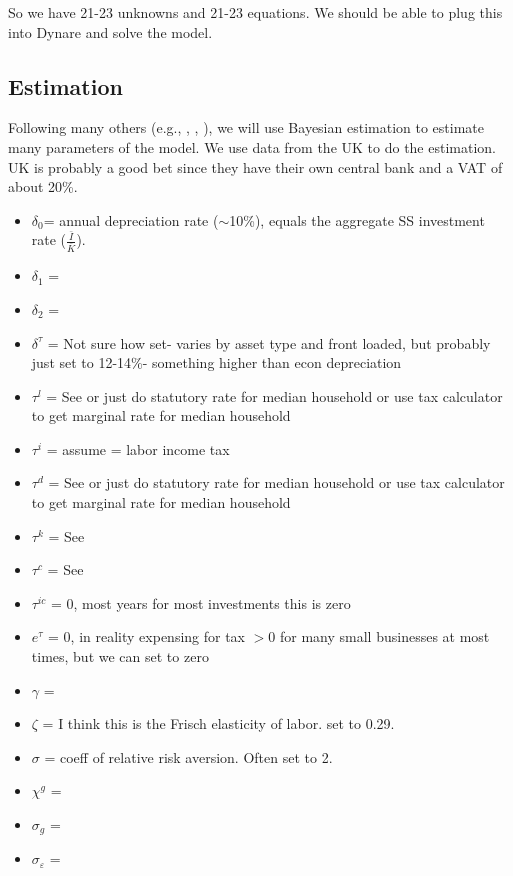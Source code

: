 \documentclass[article,11pt,letterpaper,fleqn]{article}
\theoremstyle{definition}
\numberwithin{equation}{section}
\newcommand{\cn}{\citeasnoun} %
\newcommand\ve{\varepsilon}
\begin{document}
So we have 21-23 unknowns and 21-23 equations.  We should be able to plug this into Dynare and solve the model.


\subsection{Estimation}

Following many others (e.g., \cn{TY2010}, \cn{Zubairy2010}, \cn{SW2003}), we will use Bayesian estimation to estimate many parameters of the model.  We use data from the UK to do the estimation.  UK is probably a good bet since they have their own central bank and a VAT of about 20\%.

\begin{itemize}
\item $\delta_{0}$= annual depreciation rate ($\sim$10\%), equals the aggregate SS investment rate ($\frac{\bar{I}}{\bar{K}}$).
\item $\delta_{1}$ = 
\item $\delta_{2}$ = 
\item $\delta^{\tau}$ = Not sure how set- varies by asset type and front loaded, but probably just set to 12-14\%- something higher than econ depreciation
\item $\tau^{l}$ = See \cn{Jones2002} or just do statutory rate for median household or use tax calculator to get marginal rate for median household
\item $\tau^{i}$ = assume = labor income tax
\item $\tau^{d}$ = See \cn{Jones2002} or just do statutory rate for median household or use tax calculator to get marginal rate for median household
\item $\tau^{k}$ = See \cn{Jones2002} 
\item $\tau^{c}$ = See \cn{Jones2002} 
\item $\tau^{ic}$ = 0, most years for most investments this is zero 
\item $e^{\tau}$ = 0, in reality expensing for tax $> 0$ for many small businesses at most times, but we can set to zero   
\item $\gamma$ = 
\item $\zeta$ = I think this is the Frisch elasticity of labor.  \cn{CER2010} set to 0.29.
\item $\sigma$ = coeff of relative risk aversion.  Often set to 2.
\item $\chi^{g}$ = 
\item $\sigma_{g}$ = 
\item $\sigma_{\ve}$ = 

\end{itemize}
\end{document}
